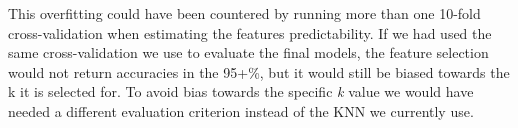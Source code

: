 This overfitting could have been countered by running more than one 10-fold cross-validation when estimating the features predictability. If we had used the same cross-validation we use to evaluate the final models, the feature selection would not return accuracies in the 95+\%, but it would still be biased towards the k it is selected for. To avoid bias towards the specific \emph{k} value we would have needed a different evaluation criterion instead of the KNN we currently use.

